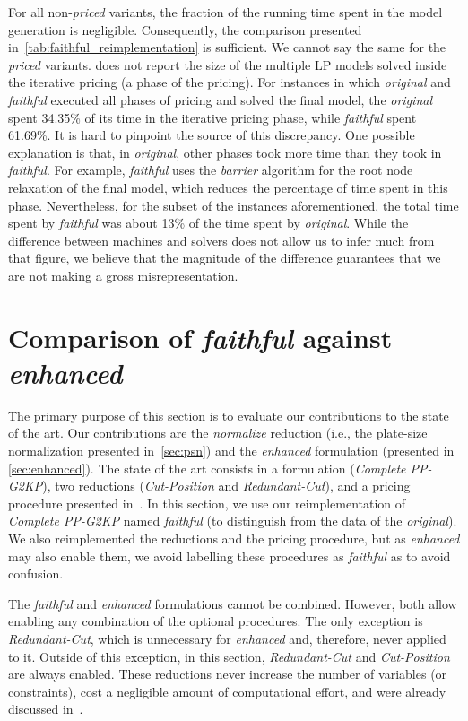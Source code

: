 \documentclass[ppgc,tese,english,formais,babel]{iiufrgs}
\begin{document}
For all non-\emph{priced} variants, the fraction of the running time spent in the model generation is negligible.
Consequently, the comparison presented in~\cref{tab:faithful_reimplementation} is sufficient.
We cannot say the same for the \emph{priced} variants.
\citet{dimitri_thesis} does not report the size of the multiple LP models solved inside the iterative pricing (a phase of the pricing).
For instances in which \emph{original} and \emph{faithful} executed all phases of pricing and solved the final model, the \emph{original} spent 34.35\% of its time in the iterative pricing phase, while \emph{faithful} spent 61.69\%.
It is hard to pinpoint the source of this discrepancy.
One possible explanation is that, in \emph{original}, other phases took more time than they took in \emph{faithful}.
For example, \emph{faithful} uses the \emph{barrier} algorithm for the root node relaxation of the final model, which reduces the percentage of time spent in this phase.
Nevertheless, for the subset of the instances aforementioned, the total time spent by \emph{faithful} was about 13\% of the time spent by \emph{original}.
While the difference between machines and solvers does not allow us to infer much from that figure, we believe that the magnitude of the difference guarantees that we are not making a gross misrepresentation.

\section{Comparison of \emph{faithful} against \emph{enhanced}}
\label{sec:comparison}

The primary purpose of this section is to evaluate our contributions to the state of the art.
Our contributions are the \emph{normalize} reduction (i.e., the plate-size normalization presented in~\cref{sec:psn}) and the \emph{enhanced} formulation (presented in \cref{sec:enhanced}).
The state of the art consists in a formulation (\emph{Complete PP-G2KP}), two reductions (\emph{Cut-Position} and \emph{Redundant-Cut}), and a pricing procedure presented in~\citet{furini:2016,dimitri_thesis}.
In this section, we use our reimplementation of \emph{Complete PP-G2KP} named \emph{faithful} (to distinguish from the data of the \emph{original}).
We also reimplemented the reductions and the pricing procedure, but as \emph{enhanced} may also enable them, we avoid labelling these procedures as \emph{faithful} as to avoid confusion.

The \emph{faithful} and \emph{enhanced} formulations cannot be combined.
However, both allow enabling any combination of the optional procedures.
The only exception is \emph{Redundant-Cut}, which is unnecessary for \emph{enhanced} and, therefore, never applied to it.
Outside of this exception, in this section, \emph{Redundant-Cut} and \emph{Cut-Position} are always enabled.
These reductions never increase the number of variables (or constraints), cost a negligible amount of computational effort, and were already discussed in~\citet{furini:2016,dimitri_thesis}.
\end{document}
